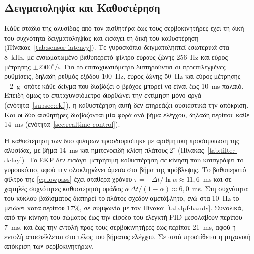 \documentclass[11pt]{report}
\begin{document}
\subsection{Δειγματοληψία και Καθυστέρηση}
\label{subsec:sensor-latency}
Κάθε στάδιο της αλυσίδας από τον αισθητήρα έως τους σερβοκινητήρες έχει τη δική
του συχνότητα δειγματοληψίας και εισάγει τη δική του καθυστέρηση
(Πίνακας~\ref{tab:sensor-latency}). Το γυροσκόπιο δειγματοληπτεί εσωτερικά στα
8~kHz, με ενσωματωμένο βαθυπερατό φίλτρο εύρους ζώνης 256~Hz και εύρος μέτρησης
$\pm 2000^\circ$/s. Για το επιταχυνσιόμετρο διατηρούνται οι προεπιλεγμένες
ρυθμίσεις, δηλαδή ρυθμός εξόδου 100~Hz, εύρος ζώνης 50~Hz και εύρος μέτρησης
$\pm 2$~g, οπότε κάθε δείγμα που διαβάζει ο βρόχος μπορεί να είναι έως 10~ms
παλαιό. Επειδή όμως το επιταχυνσιόμετρο διορθώνει την εκτίμηση μόνο αργά
(ενότητα~\ref{subsec:ekf}), η καθυστέρηση αυτή δεν επηρεάζει ουσιαστικά την
απόκριση. Και οι δύο αισθητήρες διαβάζονται μία φορά ανά βήμα ελέγχου, δηλαδή
περίπου κάθε 14~ms (ενότητα~\ref{sec:realtime-control}).

Η καθυστέρηση των δύο φίλτρων προσδιορίστηκε με αριθμητική προσομοίωση της
αλυσίδας, με βήμα 14~ms και ημιτονοειδή κλίση πλάτους $2^\circ$
(Πίνακας~\ref{tab:filter-delay}). Το EKF δεν εισάγει μετρήσιμη καθυστέρηση σε
κίνηση που καταγράφει το γυροσκόπιο, αφού την ολοκληρώνει άμεσα στο βήμα της
πρόβλεψης. Το βαθυπερατό φίλτρο της \eqref{eq:lowpass} έχει σταθερά χρόνου
$\tau = -\Delta t/\ln\alpha \approx 11{,}6$~ms και σε χαμηλές συχνότητες
καθυστέρηση ομάδας $\alpha\,\Delta t/(1-\alpha) \approx 6{,}0$~ms. Στη
συχνότητα του κύκλου βαδίσματος διατηρεί το πλάτος σχεδόν αμετάβλητο, ενώ στα
10~Hz το μειώνει κατά περίπου 17\%, σε συμφωνία με τον
Πίνακα~\ref{tab:lpf-bands}. Συνολικά, από την κίνηση του σώματος έως την είσοδο
του ελεγκτή PID μεσολαβούν περίπου 7~ms, και έως την εντολή προς τους
σερβοκινητήρες έως περίπου 21~ms, αφού η εντολή αποστέλλεται στο τέλος του
βήματος ελέγχου. Σε αυτά προστίθεται η μηχανική απόκριση των σερβοκινητήρων.
\end{document}
